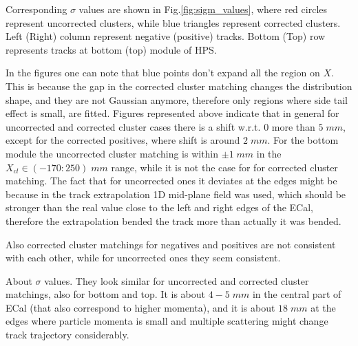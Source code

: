 \documentclass[letterpaper,12pt]{article}
\begin{document}
 Corresponding $\sigma$ values are shown in Fig.\ref{fig:sigm_values},  where red circles represent 
 uncorrected clusters, while blue triangles represent corrected clusters. Left (Right) column represent 
 negative (positive) tracks. Bottom (Top) row represents tracks at bottom (top) module of HPS.
 
 In the figures one can note that blue points don't expand all the region on $X$. This is because
 the gap in the corrected cluster matching changes the distribution shape, and they are not Gaussian
 anymore, therefore only regions where side tail effect is small, are fitted.
 Figures represented above indicate that in general for uncorrected and corrected cluster cases
 there is a shift w.r.t. $0$ more than $5\;mm$, except for the corrected positives, where shift is 
 around $2\;mm$.
 For the bottom module the uncorrected cluster matching is within $\pm 1\;mm$ in the $X_{cl}\in(-170 : 250)\;mm$
 range, while it is not the case for for corrected cluster matching.
 The fact that for uncorrected ones it deviates at the edges might be because in the track extrapolation
 1D mid-plane field was used, which should be stronger than the real value close to the left and right edges 
 of the ECal, therefore the extrapolation bended the track more than actually it was bended.
 
 Also corrected cluster matchings for negatives and positives are not consistent 
 with each other, while for uncorrected ones they seem consistent.
 
 About $\sigma$ values. They look similar for uncorrected and corrected cluster matchings, also
 for bottom and top. It is about $4-5\;mm$ in the central part of ECal (that also correspond to higher momenta), 
 and it is about $18\;mm$ at the edges where particle momenta is small and multiple scattering
 might change track trajectory considerably.
 
\end{document}
